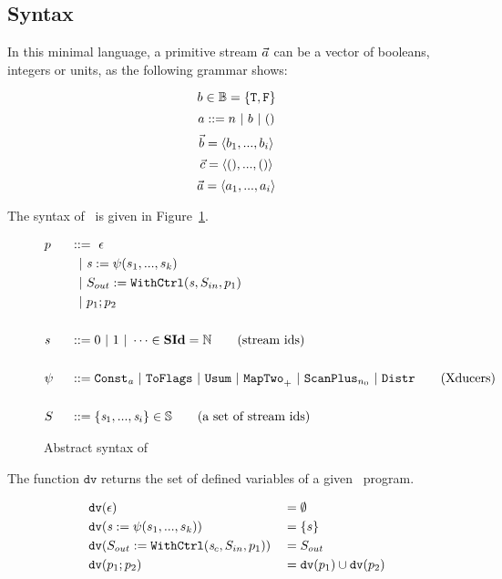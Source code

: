 \subsection{Syntax}
In this minimal language, a primitive stream $\vec a$ can be a vector of booleans, integers or units, as the following grammar shows:

$$b \in \mathbb{B} = \{\mathtt{T},\mathtt{F} \}$$
$$ a ::= n \ | \ b \ | \ ()$$
$$\vec b = \langle b_1,...,b_i \rangle$$ 
$$\vec c = \langle (),...,() \rangle $$
$$\vec a = \langle a_1,...,a_i \rangle  $$ 

\hspace{1cm}

The syntax of \fmsvcode \  is given in Figure~\ref{fig-svcode-grammar}.


\begin{figure}[H] \large
	\begin{alignat*}{2}
	&p  && :: = \ \epsilon \\ 
	&   &&\ \ | \ \mathit{s} := \psi(s_1,...,s_k) \\
	&   &&\ \ | \ S_{out} := \mathtt{WithCtrl}(\mathit{s},S_{in},p_1) \\
	&   &&\ \ | \ p_1;p_2  \\
	\\
	&\mathit{s} && ::= 0 \ | \ 1 \ | \ \cdots \in \mathbf{SId}  = \mathbb{N}   \tag{stream ids}\\
	\\
	& \psi \ && ::= \mathtt{Const_{\emph{a}}} \ | \ \mathtt{ToFlags}  
	\ | \ \mathtt{Usum} \ | \ \mathtt{MapTwo}_{+} \ | \ \mathtt{ScanPlus}_{n_0} \ | \ \mathtt{Distr}  \tag{Xducers} \\
	\\
	&  S && ::= \{\mathit{s}_1,..., \mathit{s}_i\} \in \mathbb{S}  \tag{a set of stream ids}
	\end{alignat*}
	\caption{Abstract syntax of \fmsvcode \  \label{fig-svcode-grammar}}

\end{figure}


The function $\texttt{dv}$ returns the set of defined variables of a given \fmsvcode \  program.

\begin{alignat*}{2}
&\mathtt{dv}(\epsilon) && =  \emptyset \\
&\mathtt{dv}(\mathit{s} := \psi(s_1,...,s_k)) && =  \{s\} \\
&\mathtt{dv}(S_{out} := \mathtt{WithCtrl}(\mathit{s}_c,S_{in},p_1)) && =   S_{out} \\
&\mathtt{dv}(p_1;p_2) && =  \mathtt{dv}(p_1) \cup \mathtt{dv}(p_2) \\
\end{alignat*}

